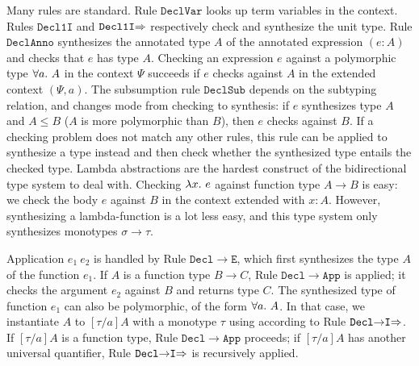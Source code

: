 Many rules are standard.
Rule $\mathtt{DeclVar}$ looks up term variables in the context.
Rules $\mathtt{Decl1I}$ and $\mathtt{Decl1I{\Rightarrow}}$ respectively check and synthesize the unit type.
Rule $\mathtt{DeclAnno}$ synthesizes the annotated type $A$ of the annotated expression $(e:A)$
and checks that $e$ has type $A$.
Checking an expression $e$ against a polymorphic type $\all A$ in the context $\Psi$ succeeds
if $e$ checks against $A$ in the extended context $(\Psi, a)$.
The subsumption rule $\mathtt{DeclSub}$ depends on the subtyping relation,
and changes mode from checking to synthesis: if $e$ synthesizes type $A$ and $A\le B$
($A$ is more polymorphic than $B$), then $e$ checks against $B$.
If a checking problem does not match any other rules,
this rule can be applied to synthesize a type instead and then
check whether the synthesized type entails the checked type.
Lambda abstractions are the hardest construct of the bidirectional
type system to deal with. 
Checking $\lam e$ against function type $A\to B$ is easy:
we check the body $e$ against $B$ in the context extended with $x:A$.
However, synthesizing a lambda-function is a lot less easy, and 
this type system only synthesizes monotypes $\sigma\to\tau$.

Application $e_1~e_2$ is handled by Rule $\mathtt{Decl{\to}E}$,
which first synthesizes the type $A$ of the function $e_1$.
If $A$ is a function type $B\to C$, Rule $\mathtt{Decl{\to}App}$ is applied;
it checks the argument $e_2$ against $B$ and returns type $C$.
The synthesized type of function $e_1$ can also be polymorphic, of the form $\all A$.
In that case, we instantiate $A$ to $[\tau/a]A$ with a monotype $\tau$ %
using according to Rule $\mathtt{Decl{\to}I{\Rightarrow}}$.
If $[\tau/a]A$ is a function type, Rule $\mathtt{Decl{\to}App}$ proceeds;
if $[\tau/a]A$ has another universal quantifier, Rule $\mathtt{Decl{\to}I{\Rightarrow}}$ is recursively applied.

